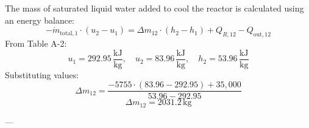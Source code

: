 The mass of saturated liquid water added to cool the reactor is calculated using an energy balance:  
\[
-\dot{m}_{\text{total},1} \cdot (u_2 - u_1) = \Delta m_{12} \cdot (h_2 - h_1) + Q_{R,12} - Q_{\text{out},12}
\]  
From Table A-2:  
\[
u_1 = 292.95 \, \frac{\text{kJ}}{\text{kg}}, \quad u_2 = 83.96 \, \frac{\text{kJ}}{\text{kg}}, \quad h_2 = 53.96 \, \frac{\text{kJ}}{\text{kg}}
\]  
Substituting values:  
\[
\Delta m_{12} = \frac{-5755 \cdot (83.96 - 292.95) + 35,000}{53.96 - 292.95}
\]  
\[
\Delta m_{12} = 2031.2 \, \text{kg}
\]  

---